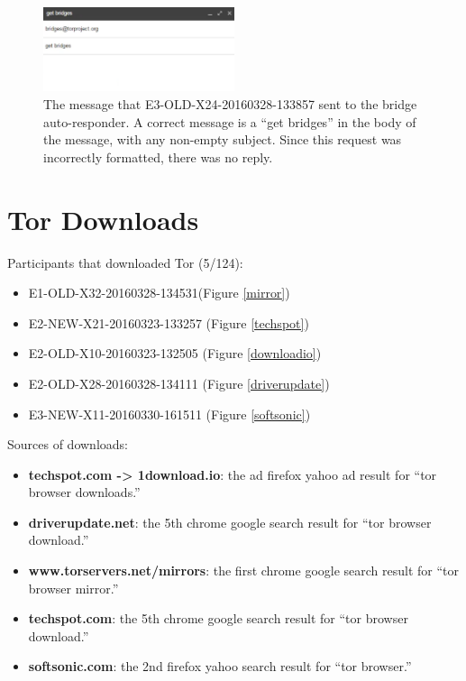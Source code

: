 \documentclass[USenglish,oneside,twocolumn]{article}
\begin{document}
\begin{figure}[h]
\label{autoresponder3}
\includegraphics[width=0.5\textwidth]{../experiment/processing/failed-participants/20160328-155924-bridgeresponder.png}
\caption{The message that E3-OLD-X24-20160328-133857 sent to the bridge auto-responder. A correct message is a ``get bridges'' in the body of the message, with any non-empty subject. Since this request was incorrectly formatted, there was no reply.}
\end{figure} 

\section{Tor Downloads}
\label{tor-downloads}

Participants that downloaded Tor (5/124): 
\begin{itemize}
\item E1-OLD-X32-20160328-134531(Figure \ref{mirror})
\item E2-NEW-X21-20160323-133257 (Figure \ref{techspot})
\item E2-OLD-X10-20160323-132505 (Figure \ref{downloadio})
\item E2-OLD-X28-20160328-134111 (Figure \ref{driverupdate})
\item E3-NEW-X11-20160330-161511 (Figure \ref{softsonic})
\end{itemize} 

Sources of downloads: 
\begin{itemize}
\item {\bfseries techspot.com -> 1download.io}: the ad firefox yahoo ad result for ``tor browser downloads.'' 
\item {\bfseries driverupdate.net}: the 5th chrome google search result for ``tor browser download.'' 
\item {\bfseries www.torservers.net/mirrors}: the first chrome google search result for ``tor browser mirror.''
\item {\bfseries techspot.com}: the 5th chrome google search result for ``tor browser download.''
\item {\bfseries softsonic.com}: the 2nd firefox yahoo search result for ``tor browser.''
\end{itemize}
\end{document}
